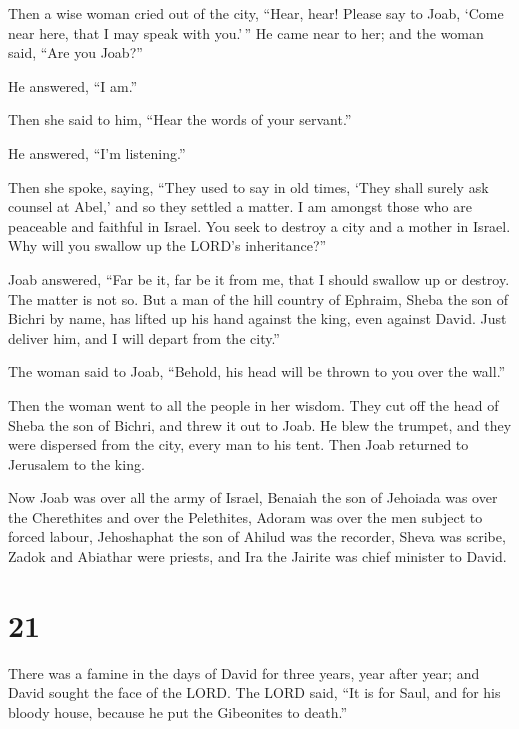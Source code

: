  Then a wise woman cried out of the city, ``Hear, hear!
Please say to Joab, `Come near here, that I may speak with you.'\,''
 He came near to her; and the woman said, ``Are you
Joab?''

He answered, ``I am.''

Then she said to him, ``Hear the words of your servant.''

He answered, ``I'm listening.''

 Then she spoke, saying, ``They used to say in old times,
`They shall surely ask counsel at Abel,' and so they settled a matter.
 I am amongst those who are peaceable and faithful in
Israel. You seek to destroy a city and a mother in Israel. Why will you
swallow up the LORD's inheritance?''

 Joab answered, ``Far be it, far be it from me, that I
should swallow up or destroy.  The matter is not so. But
a man of the hill country of Ephraim, Sheba the son of Bichri by name,
has lifted up his hand against the king, even against David. Just
deliver him, and I will depart from the city.''

The woman said to Joab, ``Behold, his head will be thrown to you over
the wall.''

 Then the woman went to all the people in her wisdom.
They cut off the head of Sheba the son of Bichri, and threw it out to
Joab. He blew the trumpet, and they were dispersed from the city, every
man to his tent. Then Joab returned to Jerusalem to the king.

 Now Joab was over all the army of Israel, Benaiah the
son of Jehoiada was over the Cherethites and over the Pelethites,
 Adoram was over the men subject to forced labour,
Jehoshaphat the son of Ahilud was the recorder,  Sheva
was scribe, Zadok and Abiathar were priests,  and Ira the
Jairite was chief minister to David.

\hypertarget{section-20}{%
\section{21}\label{section-20}}

 There was a famine in the days of David for three years,
year after year; and David sought the face of the LORD. The LORD said,
``It is for Saul, and for his bloody house, because he put the
Gibeonites to death.''

